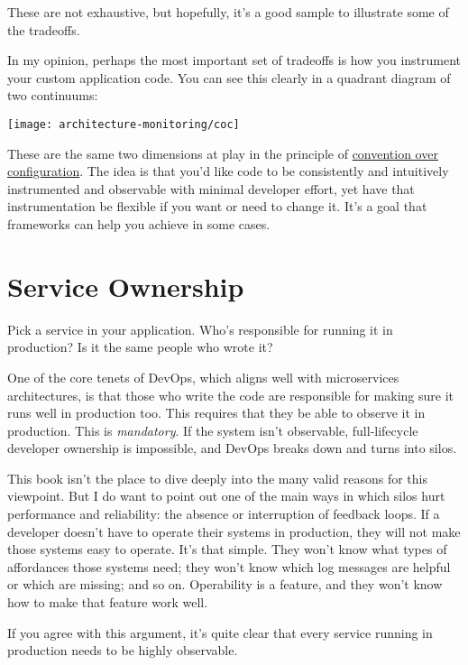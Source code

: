 \documentclass{vivid_layout}
\begin{document}
These are not exhaustive, but hopefully, it's a good sample to illustrate some of
the tradeoffs.

In my opinion, perhaps the most important set of tradeoffs is how you instrument
your custom application code. You can see this clearly in a quadrant diagram of two
continuums:
\begin{center}
\texttt{[image: architecture-monitoring/coc]}
\end{center}

These are the same two dimensions at play in the principle of
\href{https://en.wikipedia.org/wiki/Convention\_over\_configuration}{convention
over configuration}. The idea is that you'd like code to be consistently and
intuitively instrumented and observable with minimal developer effort, yet have
that instrumentation be flexible if you want or need to change it.
It's a goal that frameworks can help you achieve in some cases.

\section{Service Ownership}

Pick a service in your application. Who's responsible for running it in
production? Is it the same people who wrote it?

One of the core tenets of DevOps, which aligns well with microservices
architectures, is that those who write the code are responsible for making sure
it runs well in production too. This requires that they be
able to observe it in production. This is \emph{mandatory}. If the system isn't observable, full-lifecycle developer ownership is impossible, and DevOps breaks down and turns into silos.

This book isn't the place to dive deeply into the many valid reasons for this
viewpoint. But I do want to point out one of the main ways in which
silos hurt performance and reliability: the absence or interruption of feedback
loops. If a developer doesn't have to operate their systems in production, they
will not make those systems easy to operate. It's that simple. They won't know
what types of affordances those systems need; they won't know which log messages
are helpful or which are missing; and so on. Operability is a feature, and they
won't know how to make that feature work well.

If you agree with this argument, it's quite clear that every service running in
production needs to be highly observable.
\end{document}
